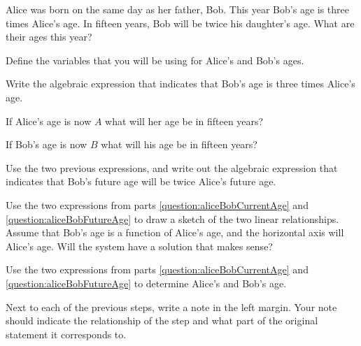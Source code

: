 \begin{problem}
\item Alice was born on the same day as her father, Bob. This year
  Bob's age is three times Alice's age. In fifteen years, Bob will be
  twice his daughter's age. What are their ages this year?
  \begin{subproblem}
  \item Define the variables that you will be using for Alice's and
    Bob's ages.
    \vspace{2em}
  \item Write the algebraic expression that
    indicates that Bob's age is three times Alice's age.  
    \label{question:aliceBobCurrentAge}
    \vspace{2em}
  \item If Alice's age is now $A$ what will her age be in fifteen
    years?  
    \vspace{2em}
  \item If Bob's age is now $B$ what will his age be in fifteen years?
    \vspace{2em}
  \item Use the two previous expressions, and write out the algebraic
    expression that indicates that Bob's future age will be twice
    Alice's future age.
    \label{question:aliceBobFutureAge}
    \vspace{2em}
  \item Use the two expressions from parts
    \ref{question:aliceBobCurrentAge} and \ref{question:aliceBobFutureAge} 
    to draw a sketch of the two linear relationships. Assume that
    Bob's age is a function of Alice's age, and the horizontal axis
    will Alice's age. Will the system have a solution that makes
    sense? 
    \vfill

  \item Use the two expressions from parts
    \ref{question:aliceBobCurrentAge} and \ref{question:aliceBobFutureAge} 
    to determine Alice's and Bob's age.
    \vfill

  \item Next to each of the previous steps, write a note in the left
    margin. Your note should indicate the relationship of the step and
    what part of the original statement it corresponds to.
  \end{subproblem}

\clearpage


\end{problem}
